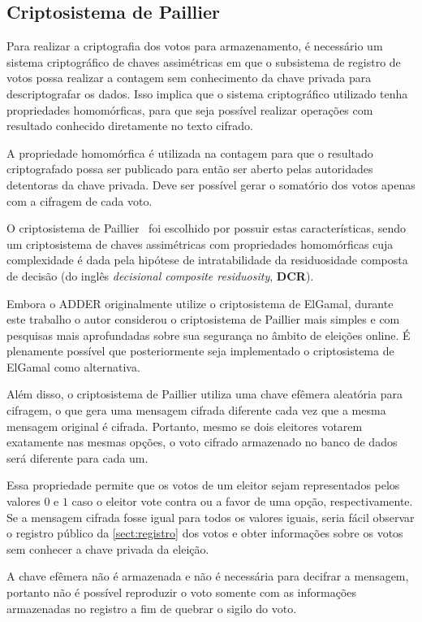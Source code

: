 \subsection{Criptosistema de Paillier}

Para realizar a criptografia dos votos para armazenamento, é necessário um
sistema criptográfico de chaves assimétricas em que o subsistema de registro de
votos possa realizar a contagem sem conhecimento da chave privada para
descriptografar os dados. Isso implica que o sistema criptográfico utilizado
tenha propriedades homomórficas, para que seja possível realizar operações com
resultado conhecido diretamente no texto cifrado.

A propriedade homomórfica é utilizada na contagem para que o resultado
criptografado possa ser publicado para então ser aberto pelas autoridades
detentoras da chave privada. Deve ser possível gerar o somatório dos votos
apenas com a cifragem de cada voto.

O criptosistema de Paillier~\cite{paillier1999public} foi escolhido por possuir
estas características, sendo um criptosistema de chaves assimétricas com
propriedades homomórficas cuja complexidade é dada pela hipótese de
intratabilidade da residuosidade composta de decisão (do inglês
\textit{decisional composite residuosity}, \textbf{DCR}).

Embora o ADDER originalmente utilize o criptosistema de ElGamal, durante este
trabalho o autor considerou o criptosistema de Paillier mais simples e com
pesquisas mais aprofundadas sobre sua segurança no âmbito de eleições online. É
plenamente possível que posteriormente seja implementado o criptosistema de
ElGamal como alternativa.

Além disso, o criptosistema de Paillier utiliza uma chave efêmera aleatória
para cifragem, o que gera uma mensagem cifrada diferente cada vez que a mesma
mensagem original é cifrada. Portanto, mesmo se dois eleitores votarem
exatamente nas mesmas opções, o voto cifrado armazenado no banco de dados será
diferente para cada um.

Essa propriedade permite que os votos de um eleitor sejam representados pelos
valores $0$ e $1$ caso o eleitor vote contra ou a favor de uma opção,
respectivamente. Se a mensagem cifrada fosse igual para todos os valores
iguais, seria fácil observar o registro público da \autoref{sect:registro} dos
votos e obter informações sobre os votos sem conhecer a chave privada da
eleição.

A chave efêmera não é armazenada e não é necessária para decifrar a mensagem,
portanto não é possível reproduzir o voto somente com as informações
armazenadas no registro a fim de quebrar o sigilo do voto.
